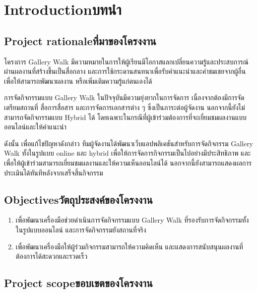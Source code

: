 \chapter{\ifenglish Introduction\else บทนำ\fi}

\section{\ifenglish Project rationale\else ที่มาของโครงงาน\fi}

โครงการ Gallery Walk มีความหมายในการให้ผู้เรียนมีโอกาสแลกเปลี่ยนความรู้และประสบการณ์ผ่านผลงานที่สร้างขึ้นเป็นสื่อกลาง และการใช้กระดานสนทนาเพื่อรับคำแนะนำและคำชมเชยจากผู้อื่น เพื่อให้สามารถพัฒนาผลงาน หรือเพิ่มเติมความรู้แก่ตนเองได้

การจัดกิจกรรมแบบ Gallery Walk ในปัจจุบันมีความยุ่งยากในการจัดการ เนื่องจากต้องมีการจัดเตรียมสถานที่ สื่อการสื่อสาร และการจัดการเอกสารต่าง ๆ ซึ่งเป็นภาระต่อผู้จัดงาน นอกจากนี้ยังไม่สามารถจัดกิจกรรมแบบ Hybrid ได้ โดยเฉพาะในกรณีที่ผู้เข้าร่วมต้องการที่จะเยี่ยมชมผลงานแบบออนไลน์และให้คำแนะนำ

ดังนั้น เพื่อแก้ไขปัญหาดังกล่าว ทีมผู้จัดงานได้พัฒนาเว็บแอปพลิเคชันสำหรับการจัดกิจกรรม Gallery Walk ทั้งในรูปแบบ online และ hybrid เพื่อให้การจัดการกิจกรรมเป็นไปอย่างมีประสิทธิภาพ และเพื่อให้ผู้เข้าร่วมสามารถเยี่ยมชมผลงานและให้ความเห็นออนไลน์ได้ นอกจากนี้ยังสามารถแสดงผลการประเมินได้ทันทีหลังจากเสร็จสิ้นกิจกรรม

\section{\ifenglish Objectives\else วัตถุประสงค์ของโครงงาน\fi}
\begin{enumerate}
    \item เพื่อพัฒนาเครื่องมือช่วยดำเนินการจัดกิจกรรมแบบ Gallery Walk ที่รองรับการจัดกิจกรรมทั้งในรูปแบบออนไลน์ และการจัดกิจกรรมยังสถานที่จริง
    \item เพื่อพัฒนาเครื่องมือให้ผู้ร่วมกิจกรรมสามารถให้ความคิดเห็น และแสดงการสนับสนุนผลงานที่ต้องการได้สะดวกและรวดเร็ว
\end{enumerate}

\section{\ifenglish Project scope\else ขอบเขตของโครงงาน\fi}


